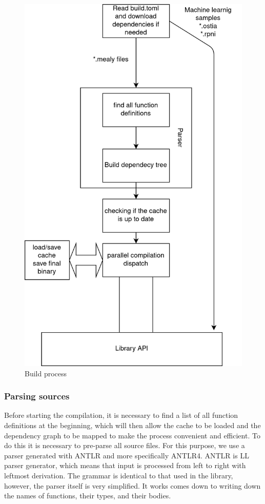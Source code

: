 \begin{figure}
\centering
\includegraphics[scale=0.40]{./diagram.png}
\caption{Build process}
\label{buildsystem:diagram}
\end{figure}

\hypertarget{parsing-sources}{%
\subsubsection{Parsing sources}\label{dependency-resolving}}

Before starting the compilation, it is necessary to find a list of all
function definitions at the beginning, which will then allow the cache
to be loaded and the dependency graph to be mapped to make the process
convenient and efficient. To do this it is necessary to pre-parse all
source files. 
For this purpose, we use a parser generated with ANTLR and more specifically
ANTLR4. ANTLR is LL parser generator, which means that input is processed
from left to right with leftmost derivation. The grammar is identical to that used
in the library, however, the parser itself is very simplified. It works
comes down to writing down the names of functions, their types, and their bodies. 

